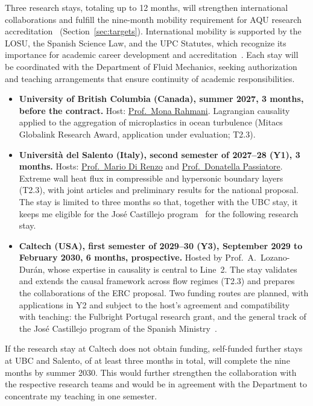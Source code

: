 \documentclass[11pt]{article}
\begin{document}
Three research stays, totaling up to 12 months, will strengthen international collaborations and fulfill the nine-month mobility requirement for AQU research accreditation~\cite{AQU2025} (Section~\ref{sec:targets}).
International mobility is supported by the LOSU, the Spanish Science Law, and the UPC Statutes, which recognize its importance for academic career development and accreditation~\cite{LOSU2023,LCTI2011,UPCStatutes2025}.
Each stay will be coordinated with the Department of Fluid Mechanics, seeking authorization and teaching arrangements that ensure continuity of academic responsibilities.
\begin{itemize}
  \item \textbf{University of British Columbia (Canada), summer 2027, 3 months, before the
  contract.} Host: \href{https://chbe.ubc.ca/mona-rahmani/}{Prof.\ Mona Rahmani}. Lagrangian
  causality applied to the aggregation of microplastics in ocean turbulence (Mitacs Globalink
  Research Award, application under evaluation; T2.3).
  
  \item \textbf{Universit\`a del Salento (Italy), second semester of 2027--28 (Y1), 3 months.} Hosts: \href{https://www.unisalento.it/scheda-utente/-/people/mario.direnzo}{Prof.\ Mario Di Renzo} and \href{https://www.unisalento.it/scheda-utente/-/people/donatella.passiatore}{Prof.\ Donatella Passiatore}. Extreme wall heat flux in compressible and hypersonic boundary layers (T2.3), with joint articles and preliminary results for the national proposal. The stay is limited to three months so that, together with the UBC stay, it keeps me eligible for the José Castillejo program~\cite{Castillejo2026} for the following research stay.
  
  \item \textbf{Caltech (USA), first semester of 2029--30 (Y3), September 2029 to February 2030, 6 months,
  prospective.} Hosted by Prof.\ A.\ Lozano-Dur\'an, whose expertise in causality is central to Line~2. The stay validates and extends the causal framework across flow regimes (T2.3) and prepares the collaborations of the ERC proposal. Two funding routes are planned, with applications in Y2 and subject to the host's agreement and compatibility with teaching: the Fulbright Portugal research grant, and the general track of the José Castillejo program of the Spanish Ministry~\cite{Castillejo2026}.
\end{itemize}
If the research stay at Caltech does not obtain funding, self-funded further stays at UBC and Salento, of at least three months in total, will complete the nine months by summer 2030. This would further strengthen the collaboration with the respective research teams and would be in agreement with the Department to concentrate my teaching in one semester.
\end{document}
